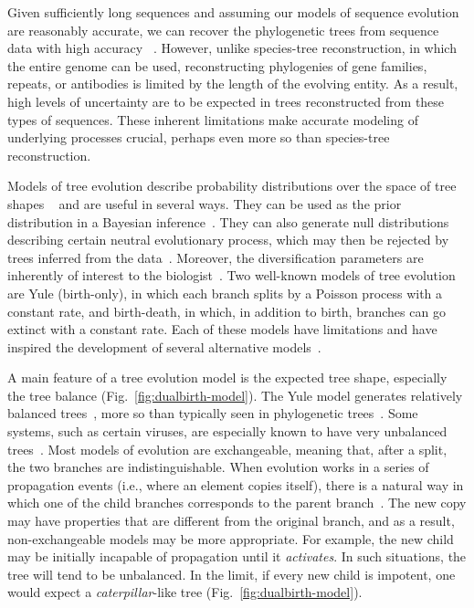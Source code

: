 Given sufficiently long sequences and assuming our models of sequence evolution are reasonably accurate, we can recover the phylogenetic trees from sequence data with high accuracy~ \cite{Felsenstein2003,Roch2010}. However, unlike species-tree reconstruction, in which the entire genome can be used, reconstructing phylogenies of gene families, repeats, or antibodies is limited by the length of the evolving entity. As a result, high levels of uncertainty are to be expected in trees reconstructed from these types of sequences. These inherent limitations make accurate modeling of underlying processes crucial, perhaps even more so than species-tree reconstruction.

Models of tree evolution describe probability distributions over the space of tree shapes ~\cite{Yule1925,Brown1994,Aldous2001} and are useful in several ways. They can be used as the prior distribution in a Bayesian inference~\cite{Drummond2007,Mooers2012,Sayyari2016}. They can also generate null distributions describing certain neutral evolutionary process, which may then be rejected by trees inferred from the data~\cite{Guyer1991,Kirkpatrick1993,Agapow2002}. Moreover, the diversification parameters are inherently of interest to the biologist~\cite{Morlon2014}. Two well-known models of tree evolution are Yule (birth-only), in which each branch splits by a Poisson process with a constant rate, and birth-death, in which, in addition to birth, branches can go extinct with a constant rate. Each of these models have limitations and have inspired the development of several alternative models~\cite{Aldous1996,Steel2001,Ford2005,Blum2006,Jones2011,Maddison2007}.

A main feature of a tree evolution model is the expected tree shape, especially the tree balance (Fig.~\ref{fig:dualbirth-model}). The Yule model generates relatively balanced trees~\cite{McKenzie2000}, more so than typically seen in phylogenetic trees~\cite{Blum2006}. Some systems, such as certain viruses, are especially known to have very unbalanced trees~\cite{Volz2013}. Most models of evolution are exchangeable, meaning that, after a split, the two branches are indistinguishable. When evolution works in a series of propagation events (i.e., where an element copies itself), there is a natural way in which one of the child branches corresponds to the parent branch~\cite{Lambert2013}. The new copy may have properties that are different from the original branch, and as a result, non-exchangeable models may be more appropriate. For example, the new child may be initially incapable of propagation until it \textit{activates}. In such situations, the tree will tend to be unbalanced. In the limit, if every new child is impotent, one would expect a \textit{caterpillar}-like tree (Fig.~\ref{fig:dualbirth-model}).

